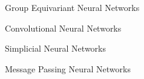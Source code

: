 \documentclass[../main.tex]{subfiles}
\begin{document}
    \begin{section}{Group Equivariant Neural Networks}
        \label{sec:3:1}
           
    \end{section}
    \begin{section}{Convolutional Neural Networks}
           
    \end{section}
    \begin{section}{Simplicial Neural Networks}
           
    \end{section}
    \begin{section}{Message Passing Neural Networks}
          
    \end{section}
\end{document}
